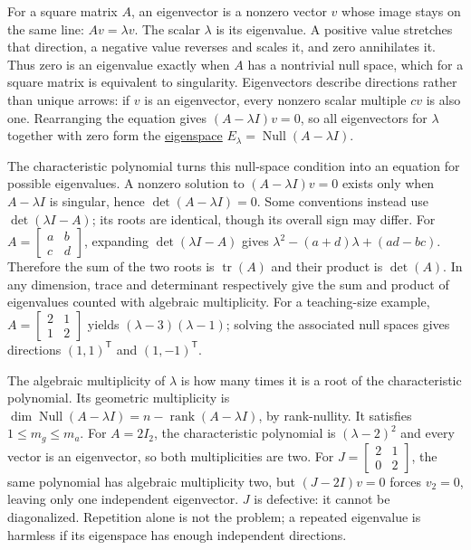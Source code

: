 \hypertarget{01-foundations-i-ch020-eigenvalues-eigenspaces-and-the-two-kinds-of-multiplicity}{}

For a square matrix \(A\), an eigenvector is a nonzero vector \(v\) whose image stays on the same line: \(Av=\lambda v\). The scalar \(\lambda\) is its eigenvalue. A positive value stretches that direction, a negative value reverses and scales it, and zero annihilates it. Thus zero is an eigenvalue exactly when \(A\) has a nontrivial null space, which for a square matrix is equivalent to singularity. Eigenvectors describe directions rather than unique arrows: if \(v\) is an eigenvector, every nonzero scalar multiple \(cv\) is also one. Rearranging the equation gives \((A-\lambda I)v=0\), so all eigenvectors for \(\lambda\) together with zero form the \hyperref[01-foundations-i-ch020-eigenvalues-eigenspaces-and-the-two-kinds-of-multiplicity]{eigenspace} \(E_\lambda=\operatorname{Null}(A-\lambda I)\).

The characteristic polynomial turns this null-space condition into an equation for possible eigenvalues. A nonzero solution to \((A-\lambda I)v=0\) exists only when \(A-\lambda I\) is singular, hence \(\det(A-\lambda I)=0\). Some conventions instead use \(\det(\lambda I-A)\); its roots are identical, though its overall sign may differ. For \(A=\begin{bmatrix}a&b\\c&d\end{bmatrix}\), expanding \(\det(\lambda I-A)\) gives \(\lambda^2-(a+d)\lambda+(ad-bc)\). Therefore the sum of the two roots is \(\operatorname{tr}(A)\) and their product is \(\det(A)\). In any dimension, trace and determinant respectively give the sum and product of eigenvalues counted with algebraic multiplicity. For a teaching-size example, \(A=\begin{bmatrix}2&1\\1&2\end{bmatrix}\) yields \((\lambda-3)(\lambda-1)\); solving the associated null spaces gives directions \((1,1)^\mathsf T\) and \((1,-1)^\mathsf T\).

The algebraic multiplicity of \(\lambda\) is how many times it is a root of the characteristic polynomial. Its geometric multiplicity is \(\dim\operatorname{Null}(A-\lambda I)=n-\operatorname{rank}(A-\lambda I)\), by rank-nullity. It satisfies \(1\le m_g\le m_a\). For \(A=2I_2\), the characteristic polynomial is \((\lambda-2)^2\) and every vector is an eigenvector, so both multiplicities are two. For \(J=\begin{bmatrix}2&1\\0&2\end{bmatrix}\), the same polynomial has algebraic multiplicity two, but \((J-2I)v=0\) forces \(v_2=0\), leaving only one independent eigenvector. \(J\) is defective: it cannot be diagonalized. Repetition alone is not the problem; a repeated eigenvalue is harmless if its eigenspace has enough independent directions.

